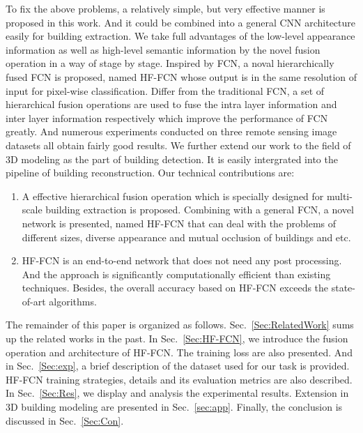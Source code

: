 To fix the above problems, a relatively simple, but very effective manner is proposed in this work. And it could be combined into a general CNN architecture easily for building extraction. We take full advantages of the low-level appearance information as well as high-level semantic information by the novel fusion operation in a way of stage by stage. 
Inspired by FCN\cite{IEEEexample:Long_2015_CVPR}, a noval hierarchically fused FCN is proposed, named HF-FCN whose output is in the same resolution of input for pixel-wise classification.
Differ from the traditional FCN, a set of hierarchical fusion operations are used to fuse the intra layer information and inter layer information respectively which improve the performance of FCN greatly.
And numerous experiments conducted on three remote sensing image datasets all obtain fairly good results.
We further extend our work to the field of 3D modeling as the part of building detection. It is easily intergrated into the pipeline of building reconstruction.
Our technical contributions are:
%
\begin{enumerate}
	\item A effective hierarchical fusion operation which is specially designed for multi-scale building extraction is proposed. Combining with a general FCN, a novel network is presented, named HF-FCN that can deal with the problems of different sizes, diverse appearance and mutual occlusion of buildings and etc.
	\item HF-FCN is an end-to-end network that does not need any post processing. And the approach is significantly computationally efficient than existing techniques. Besides, the overall accuracy based on HF-FCN exceeds the state-of-art algorithms.
\end{enumerate}

The remainder of this paper is organized as follows. Sec.~\ref{Sec:RelatedWork} sums up the related works in the past.
In Sec.~\ref{Sec:HF-FCN}, we introduce the fusion operation and architecture of HF-FCN. The training loss are also presented.
And in Sec.~\ref{Sec:exp}, a brief description of the dataset used for our task is provided. HF-FCN training strategies, details and its evaluation metrics are also described.
In Sec.~\ref{Sec:Res}, we display and analysis the experimental results.
Extension in 3D building modeling are presented in Sec.~\ref{sec:app}.
Finally, the conclusion is discussed in Sec.~\ref{Sec:Con}.
